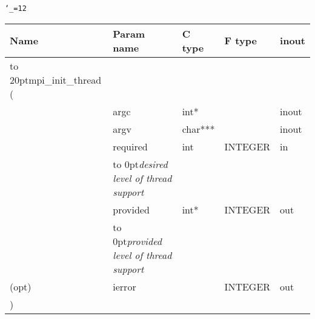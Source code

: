 \begingroup\tt\catcode`\_=12
\begin{tabular}{lllll}
\toprule
\textrm{Name}&\textrm{Param name}&\textrm{C type}&\textrm{F type}&\textrm{inout}\\
\midrule
\hbox to 20pt{mpi_init_thread (\hss} \\
&argc&int*&&inout\\
&argv&char***&&inout\\
&required&int&INTEGER&in\\ [-3pt]
&\hbox to 0pt{\footnotesize\sl desired level of thread support\hss}\\
&provided&int*&INTEGER&out\\ [-3pt]
&\hbox to 0pt{\footnotesize\sl provided level of thread support\hss}\\
(opt)&ierror&&INTEGER&out\\
)\\
\bottomrule
\end{tabular}
\endgroup

